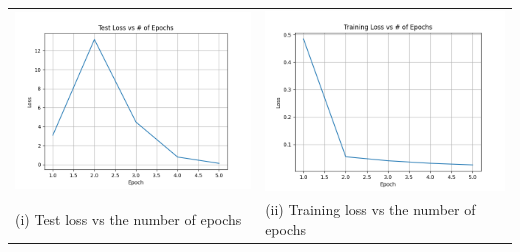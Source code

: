 \documentclass{article}
\begin{document}
\begin{titlepage}
\begin{tabular}{ll}
  \includegraphics[width=.5\linewidth]{testL.png} &  \includegraphics[width=.5\linewidth]{trainL.png}\\
 \hfil (i) Test loss vs the number of epochs \hfil & \hfil (ii) Training loss vs the number of epochs \hfil 
 

\end{tabular}
\end{titlepage}
\end{document}
